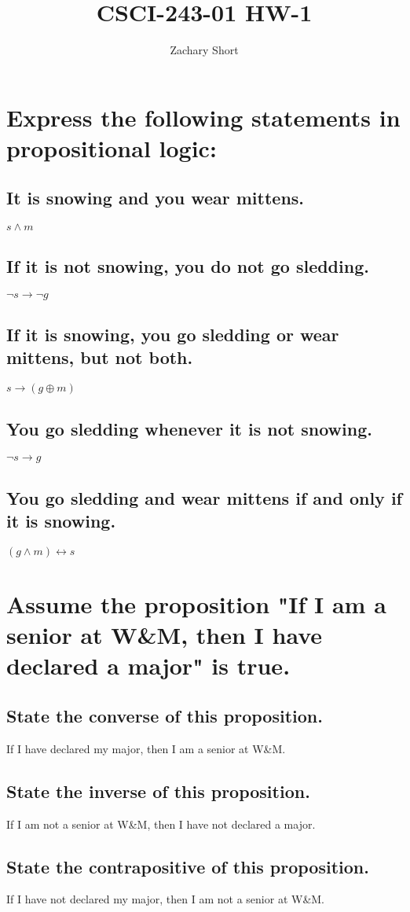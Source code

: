 \documentclass{article}
\title{CSCI-243-01 HW-1}
\author{Zachary Short}
\begin{document}
\maketitle

\section{Express the following statements in propositional logic:}
    \subsection{It is snowing and you wear mittens.} $s \land m$
    \subsection{If it is not snowing, you do not go sledding.} $\neg s \rightarrow \neg g$
    \subsection{If it is snowing, you go sledding or wear mittens, but not both.} $s \rightarrow (g \oplus m)$
    \subsection{You go sledding whenever it is not snowing.} $\neg s \rightarrow g$
    \subsection{You go sledding and wear mittens if and only if it is snowing.}$(g \land m) \leftrightarrow s$

\section{Assume the proposition "If I am a senior at W\&M, then I have declared a major" is true.}
    \subsection{State the converse of this proposition.} If I have declared my major, then I am a senior at W\&M.
    \subsection{State the inverse of this proposition.} If I am not a senior at W\&M, then I have not declared a major.
    \subsection{State the contrapositive of this proposition.} If I have not declared my major, then I am not a senior at W\&M. 
\end{document}
